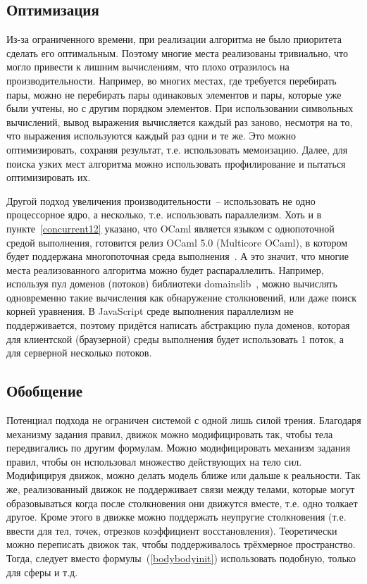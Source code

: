 \subsection{Оптимизация}\label{optimization}

Из-за ограниченного времени, при реализации алгоритма не было приоритета сделать его оптимальным.
Поэтому многие места реализованы тривиально, что могло привести к лишним вычислениям, что плохо отразилось на производительности.
Например, во многих местах, где требуется перебирать пары,
можно не перебирать пары одинаковых элементов и пары, которые уже были учтены, но с другим порядком элементов.
При использовании символьных вычислений, вывод выражения вычисляется каждый раз заново, несмотря на то, что выражения используются каждый раз одни и те же.
Это можно оптимизировать, сохраняя результат, т.е. использовать мемоизацию.
Далее, для поиска узких мест алгоритма можно использовать профилирование и пытаться оптимизировать их.

Другой подход увеличения производительности~-- использовать не одно процессорное ядро, а несколько, т.е. использовать параллелизм.
Хоть и в пункте~\ref{concurrent12} указано, что OCaml является языком с однопоточной средой выполнения,
готовится релиз OCaml 5.0 (Multicore OCaml), в котором будет поддержана многопоточная среда выполнения~\cite{infoqmulticore}.
А это значит, что многие места реализованного алгоритма можно будет распараллелить.
Например, используя пул доменов (потоков) библиотеки domainslib~\cite{domainslibgithub},
можно вычислять одновременно такие вычисления как обнаружение столкновений, или даже поиск корней уравнения.
В JavaScript среде выполнения параллелизм не поддерживается, поэтому придётся написать абстракцию пула доменов,
которая для клиентской (браузерной) среды выполнения будет использовать 1 поток, а для серверной несколько потоков.

\subsection{Обобщение}

Потенциал подхода не ограничен системой с одной лишь силой трения.
Благодаря механизму задания правил, движок можно модифицировать так, чтобы тела передвигались по другим формулам.
Можно модифицировать механизм задания правил, чтобы он использовал множество действующих на тело сил.
Модифицируя движок, можно делать модель ближе или дальше к реальности.
Так же, реализованный движок не поддерживает связи между телами, которые
могут образовываться когда после столкновения они движутся вместе, т.е. одно толкает другое.
Кроме этого в движке можно поддержать неупругие столкновения (т.е. ввести для тел, точек, отрезков коэффициент восстановления).
Теоретически можно переписать движок так, чтобы поддерживалось трёхмерное пространство.
Тогда, следует вместо формулы~(\ref{bodybodyinit}) использовать подобную, только для сферы и т.д.


